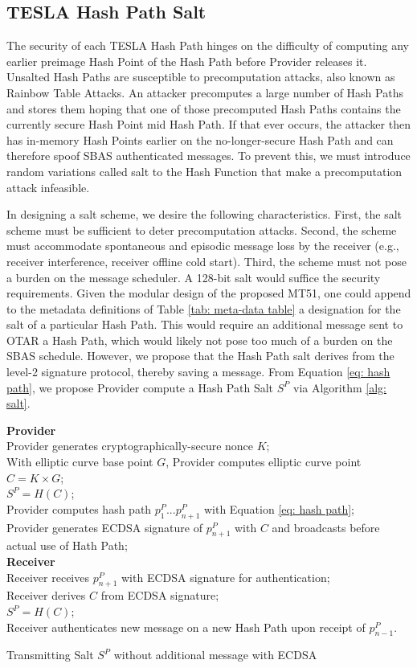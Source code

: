 \documentclass[letterpaper,times]{IONconf/IONconf}
\begin{document}
\subsection{TESLA Hash Path Salt} \label{sec: salt}

The security of each TESLA Hash Path hinges on the difficulty of computing any earlier preimage Hash Point of the Hash Path before Provider releases it.
Unsalted Hash Paths are susceptible to precomputation attacks, also known as Rainbow Table Attacks.
An attacker precomputes a large number of Hash Paths and stores them hoping that one of those precomputed Hash Paths contains the currently secure Hash Point mid Hash Path.
If that ever occurs, the attacker then has in-memory Hash Points earlier on the no-longer-secure Hash Path and can therefore spoof SBAS authenticated messages.
To prevent this, we must introduce random variations called salt to the Hash Function that make a precomputation attack infeasible.

In designing a salt scheme, we desire the following characteristics.
First, the salt scheme must be sufficient to deter precomputation attacks.
Second, the scheme must accommodate spontaneous and episodic message loss by the receiver (e.g., receiver interference, receiver offline cold start).
Third, the scheme must not pose a burden on the message scheduler.
A 128-bit salt would suffice the security requirements.
Given the modular design of the proposed MT51, one could append to the metadata definitions of Table \ref{tab: meta-data table} a designation for the salt of a particular Hash Path.
This would require an additional message sent to OTAR a Hash Path, which would likely not pose too much of a burden on the SBAS schedule.
However, we propose that the Hash Path salt derives from the level-2 signature protocol, thereby saving a message.
From Equation \eqref{eq: hash path}, we propose Provider compute a Hash Path Salt $S^P$ via Algorithm \ref{alg: salt}.

\begin{algorithm}[H] \label{alg: salt}
\SetAlgoLined
{\bf Provider} \\
Provider generates cryptographically-secure nonce $K$;\\
With elliptic curve base point $G$, Provider computes elliptic curve point $C = K \times G$; \\
$S^P = H(C)$; \\
Provider computes hash path $p^P_1 ... p^P_{n+1}$ with Equation \eqref{eq: hash path}; \\
Provider generates ECDSA signature of $p^P_{n+1}$ with $C$ and broadcasts before actual use of Hath Path; \\
{\bf Receiver} \\
Receiver receives $p^P_{n+1}$ with ECDSA signature for authentication; \\
Receiver derives $C$ from ECDSA signature; \\
$S^P = H(C)$; \\
Receiver authenticates new message on a new Hash Path upon receipt of $p^P_{n-1}$.
\caption{Transmitting Salt $S^P$ without additional message with ECDSA}
\end{algorithm}
\end{document}
